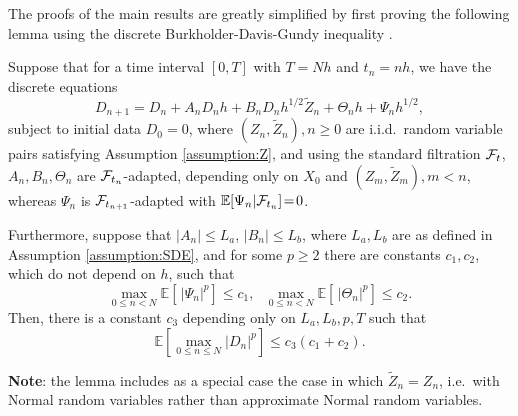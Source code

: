 \documentclass[review]{siamart190516}
\def \EE {{\mathbb{E}}}
\def \tZ {{\widetilde{Z}}}
\begin{document}
The proofs of the main results are greatly simplified by first proving 
the following lemma using the discrete Burkholder-Davis-Gundy 
inequality \cite{bdg72}.

\begin{lemma}
\label{lemma:key}
Suppose that for a time interval $[0,T]$ with $T {=} Nh$ and $t_n {=} nh$, 
we have the discrete equations
\[
D_{n+1} = D_n + A_n D_n h + B_n D_n h^{1/2} \tZ_n + \Theta_n h + \Psi_n h^{1/2},
\]
subject to initial data $D_0\!=\!0$, where $(Z_n,\tZ_n), n{\geq}0$
are i.i.d.~random variable pairs satisfying Assumption \ref{assumption:Z},
and using the standard filtration ${\cal F}_t$, 
$A_n, B_n, \Theta_n$ are ${\cal F}_{t_n}$-adapted, depending only
on $X_0$ and $(Z_m,\tZ_m), m{<}n$, whereas 
$\Psi_n$ is ${\cal F}_{t_{n+1}}$-adapted
with $\EE[\Psi_n | {\cal F}_{t_n}] \!=\! 0$.

Furthermore, suppose that $|A_n| \!\leq\! L_a$, $|B_n| \!\leq\! L_b$, 
where $L_a, L_b$ are as defined in Assumption \ref{assumption:SDE}, 
and for some $p\!\geq\! 2$ there are constants $c_1, c_2$, which do not 
depend on $h$, such that
\[
\max_{0\leq n < N} \EE[\, |\Psi_n|^p ] \leq c_1,~~~
\max_{0\leq n < N} \EE[\, |\Theta_n|^p ] \leq c_2.
\]
Then, there is a constant $c_3$ depending only on 
$L_a, L_b, p, T$ such that
\[
\EE \left[ \max_{0\leq n \leq N} |D_n|^p \right] \leq c_3 (c_1 {+} c_2).
\]
\end{lemma}

\noindent
{\bf Note}: the lemma includes as a special case the case in which
$\tZ_n \!=\! Z_n$, i.e.~with Normal random variables rather than approximate 
Normal random variables.
\end{document}
